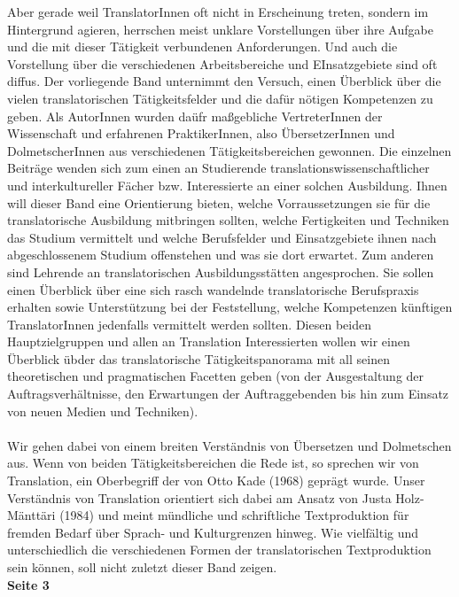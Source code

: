\documentclass{article}
\begin{document}
	Aber gerade weil TranslatorInnen oft nicht in Erscheinung treten, sondern im Hintergrund agieren, herrschen meist unklare Vorstellungen über ihre Aufgabe und die mit dieser Tätigkeit verbundenen Anforderungen. Und auch die Vorstellung über die verschiedenen Arbeitsbereiche und EInsatzgebiete sind oft diffus. Der vorliegende Band unternimmt den Versuch, einen Überblick über die vielen translatorischen Tätigkeitsfelder und die dafür nötigen Kompetenzen zu geben. Als AutorInnen wurden daüfr maßgebliche VertreterInnen der Wissenschaft und erfahrenen PraktikerInnen, also ÜbersetzerInnen und DolmetscherInnen aus verschiedenen Tätigkeitsbereichen gewonnen. Die einzelnen Beiträge wenden sich zum einen an Studierende translationswissenschaftlicher und interkultureller Fächer bzw. Interessierte an einer solchen Ausbildung. Ihnen will dieser Band eine Orientierung bieten, welche Vorraussetzungen sie für die translatorische Ausbildung mitbringen sollten, welche Fertigkeiten und Techniken das Studium vermittelt und welche Berufsfelder und Einsatzgebiete ihnen nach abgeschlossenem Studium offenstehen und was sie dort erwartet. Zum anderen sind Lehrende an translatorischen Ausbildungsstätten angesprochen. Sie sollen einen Überblick über eine sich rasch wandelnde translatorische Berufspraxis erhalten sowie Unterstützung bei der Feststellung, welche Kompetenzen künftigen TranslatorInnen jedenfalls vermittelt werden sollten. Diesen beiden Hauptzielgruppen und allen an Translation Interessierten wollen wir einen Überblick übder das translatorische Tätigkeitspanorama mit all seinen theoretischen und pragmatischen Facetten geben (von der Ausgestaltung der Auftragsverhältnisse, den Erwartungen der Auftraggebenden bis hin zum Einsatz von neuen Medien und Techniken). \\ \\
	Wir gehen dabei von einem breiten Verständnis von Übersetzen und Dolmetschen aus. Wenn von beiden Tätigkeitsbereichen die Rede ist, so sprechen wir von Translation, ein Oberbegriff der von Otto Kade (1968) geprägt wurde. Unser Verständnis von Translation orientiert sich dabei am Ansatz von Justa Holz-Mänttäri (1984) und meint mündliche und schriftliche Textproduktion für fremden Bedarf über Sprach- und Kulturgrenzen hinweg. Wie vielfältig und unterschiedlich die verschiedenen Formen der translatorischen Textproduktion sein können, soll nicht zuletzt dieser Band zeigen. \\
	\textbf{Seite 3} \\
\end{document}
